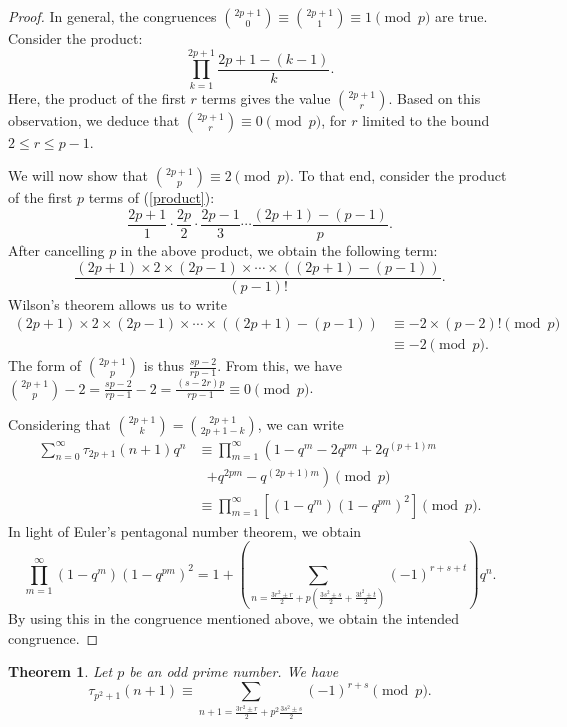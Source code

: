 \documentclass[10pt]{article}
\newtheorem{theorem}{Theorem}[section]
\theoremstyle{definition}
\begin{document}
\begin{proof}
In general, the congruences ${{2p+1}\choose{0}}\equiv {{2p+1}\choose{1}}\equiv 1\pmod{p}$ are true.
Consider the product:
\begin{equation}\label{product}
\prod_{k=1}^{2p+1}\frac{2p+1-(k-1)}{k}.
\end{equation}
Here, the product of the first $r$ terms gives the value ${{2p+1}\choose{r}}$. Based on this observation, we deduce that ${{2p+1}\choose{r}}\equiv 0\pmod{p}$, for $r$ limited to the bound $2\leq r\leq p-1$.

We will now show that ${{2p+1}\choose{p}}\equiv 2\pmod{p}$. To that end, consider the product of the first $p$ terms of (\ref{product}):
\[\frac{2p+1}{1}\cdot\frac{2p}{2}\cdot\frac{2p-1}{3}\cdots\frac{(2p+1)-(p-1)}{p}.
\]
After cancelling $p$ in the above product, we obtain the following term:
\[\frac{(2p+1)\times{2}\times(2p-1)\times\cdots\times{((2p+1)-(p-1))}}{(p-1)!}.
\]
Wilson's theorem allows us to write
\begin{align*}
(2p+1)\times{2}\times(2p-1)\times\cdots\times((2p+1)-(p-1))&\equiv -2\times(p-2)!\pmod{p}\\
&\equiv -2\pmod{p}.
\end{align*}
The form of ${{2p+1}\choose{p}}$ is thus $\frac{sp-2}{rp-1}$. From this, we have ${{2p+1}\choose{p}}-2=\frac{sp-2}{rp-1}-2=\frac{(s-2r)p}{rp-1}\equiv 0\pmod{p}$.

Considering that ${{2p+1}\choose{k}}={{2p+1}\choose{2p+1-k}}$, we can write
\begin{align*}
\sum_{n=0}^{\infty}\tau_{2p+1}(n+1)q^n
&\equiv\prod_{m=1}^{\infty}\left(1-q^m-2q^{pm}+2q^{(p+1)m}\right.\\
&\text{\ \ \ \ \ \ \ \ \ \ \ \ }\left.+q^{2pm}-q^{(2p+1)m}\right)\pmod{p}\\ 
&\equiv\prod_{m=1}^{\infty}\left[(1-q^m){(1-q^{pm})^2}\right]\pmod{p}.
\end{align*}
In light of Euler's pentagonal number theorem, we obtain
\[
\prod_{m=1}^{\infty}(1-q^m)(1-q^{pm})^2=1+\left(\sum_{n=\frac{3r^2\pm r}{2}+p\left(\frac{3s^2\pm s}{2}+\frac{3t^2\pm t}{2}\right)}(-1)^{r+s+t}\right)q^n.
\]
By using this in the congruence mentioned above, we obtain the intended congruence. 
\end{proof}
\begin{theorem}
Let $p$ be an odd prime number. We have
\begin{equation}
\tau_{p^2+1}(n+1)\equiv\sum_{n+1=\frac{3r^2\pm r}{2}+p^2\frac{3s^2\pm s}{2}}(-1)^{r+s}\pmod{p}.
\end{equation}
\end{theorem}
\end{document}
